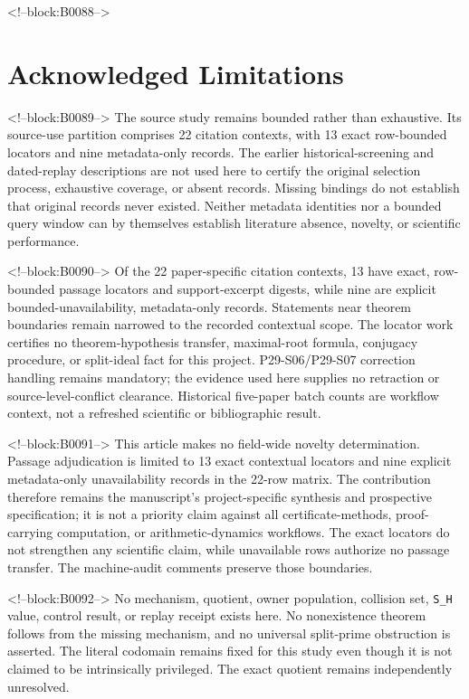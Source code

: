 \documentclass[11pt,a4paper]{article}
\begin{document}
<!--block:B0088-->
\section{Acknowledged Limitations}

<!--block:B0089-->
The source study remains bounded rather than exhaustive. Its source-use partition comprises 22 citation contexts, with 13 exact row-bounded locators and nine metadata-only records. The earlier historical-screening and dated-replay descriptions are not used here to certify the original selection process, exhaustive coverage, or absent records. Missing bindings do not establish that original records never existed. Neither metadata identities nor a bounded query window can by themselves establish literature absence, novelty, or scientific performance.

<!--block:B0090-->
Of the 22 paper-specific citation contexts, 13 have exact,
row-bounded passage locators and support-excerpt digests, while nine are explicit
bounded-unavailability, metadata-only records. Statements near theorem boundaries
remain narrowed to the recorded contextual scope. The locator work certifies no
theorem-hypothesis transfer, maximal-root formula, conjugacy procedure, or split-ideal
fact for this project. P29-S06/P29-S07 correction handling remains mandatory;
the evidence used here supplies no retraction or source-level-conflict clearance. Historical five-paper batch counts are workflow context, not a refreshed
scientific or bibliographic result.

<!--block:B0091-->
This article makes no field-wide novelty determination. Passage adjudication is limited to 13 exact contextual locators and nine
explicit metadata-only unavailability records in the 22-row matrix. The contribution
therefore remains the manuscript's project-specific synthesis and prospective
specification; it is not a priority claim against all certificate-methods,
proof-carrying computation, or arithmetic-dynamics workflows. The exact locators do
not strengthen any scientific claim, while unavailable rows authorize no passage
transfer. The machine-audit comments preserve those boundaries.

<!--block:B0092-->
No mechanism, quotient, owner population, collision set, \texttt{S\_H} value, control result, or replay receipt exists here. No nonexistence theorem follows from the missing mechanism, and no universal split-prime obstruction is asserted. The literal codomain remains fixed for this study even though it is not claimed to be intrinsically privileged. The exact quotient remains independently unresolved.
\end{document}
